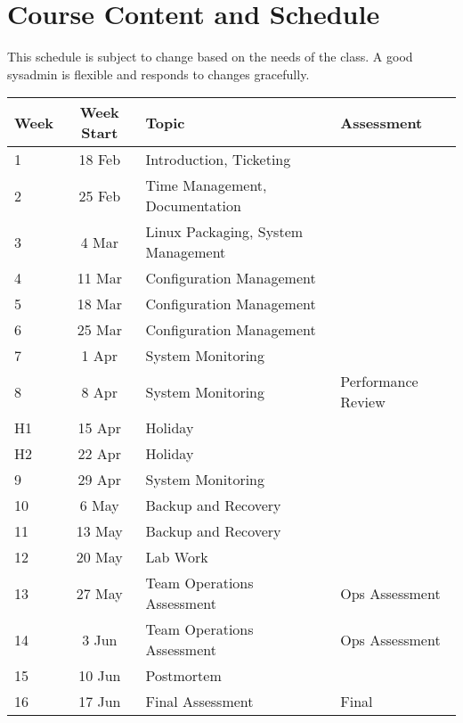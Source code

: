 \documentclass{article}
\begin{document}
\pagebreak

\section*{Course Content and Schedule}
This schedule is subject to change based on the needs of the class. A good sysadmin is flexible and responds to changes gracefully.

\renewcommand{\arraystretch}{1.5}
\begin{tabular}{|l|c|l|l|}
\hline
 Week     & Week Start & Topic                              & Assessment         \\ \hline
 1        & 18 Feb     & Introduction, Ticketing            &                    \\ \hline
 2        & 25 Feb     & Time Management, Documentation     &                    \\ \hline
 3        &  4 Mar     & Linux Packaging, System Management &                    \\ \hline
 4        & 11 Mar     & Configuration Management           &                    \\ \hline
 5        & 18 Mar     & Configuration Management           &                    \\ \hline
 6        & 25 Mar     & Configuration Management           &                    \\ \hline
 7        & 1 Apr      & System Monitoring                  &                    \\ \hline
 8        & 8 Apr      & System Monitoring                  & Performance Review \\ \hline
 H1       & 15 Apr     & Holiday                            &                    \\ \hline
 H2       & 22 Apr     & Holiday                            &                    \\ \hline
 9        & 29 Apr     & System Monitoring                  &                    \\ \hline
 10       &  6 May     & Backup and Recovery                &                    \\ \hline
 11       & 13 May     & Backup and Recovery                &                    \\ \hline
 12       & 20 May     & Lab Work                           &                    \\ \hline
 13       & 27 May     & Team Operations Assessment         &  Ops Assessment    \\ \hline
 14       &  3 Jun     & Team Operations Assessment         &  Ops Assessment    \\ \hline
 15       & 10 Jun     & Postmortem                         &                    \\ \hline
 16       & 17 Jun     & Final Assessment                   & Final              \\ \hline
\end{tabular}
\end{document}

